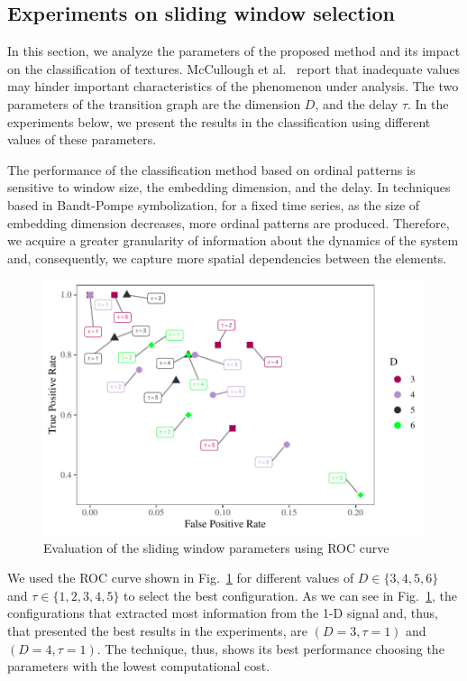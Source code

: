 \documentclass[journal]{IEEEtran}
\begin{document}
	\subsection{Experiments on sliding window selection}
	
	In this section, we analyze the parameters of the proposed method and its impact on the classification of textures.
	McCullough et al.~\cite{McCullough2015lagged} report that inadequate values may hinder important characteristics of the phenomenon under analysis.
	The two parameters of the transition graph are the dimension $D$, and the delay $\tau$.
	In the experiments below, we present the results in the classification using different values of these parameters.
	
	The performance of the classification method based on ordinal patterns is sensitive to window size, the embedding dimension, and the delay.
	In techniques based in Bandt-Pompe symbolization, for a fixed time series, as the size of embedding dimension decreases, more ordinal patterns are produced.
	Therefore, we acquire a greater granularity of information about the dynamics of the system and, consequently, we capture more spatial dependencies between the elements.
	
	\begin{figure}[hbt]
		\includegraphics[width=\columnwidth]{Figures/ROC.pdf}
		\caption{Evaluation of the sliding window parameters using ROC curve}
		\label{fig:ROC}
	\end{figure} 
	
	We used the ROC curve shown in Fig.~\ref{fig:ROC} for different values of $D \in \{3, 4, 5, 6 \} $ and $\tau \in \{1, 2, 3, 4, 5 \}$ to select the best configuration.
	As we can see in Fig.~\ref{fig:ROC}, the configurations that extracted most information from the 1-D signal and, thus, that presented the best results in the experiments, are $(D = 3, \tau = 1)$ and $(D = 4, \tau = 1)$.
	The technique, thus, shows its best performance choosing the parameters with the lowest computational cost.
	
\end{document}
